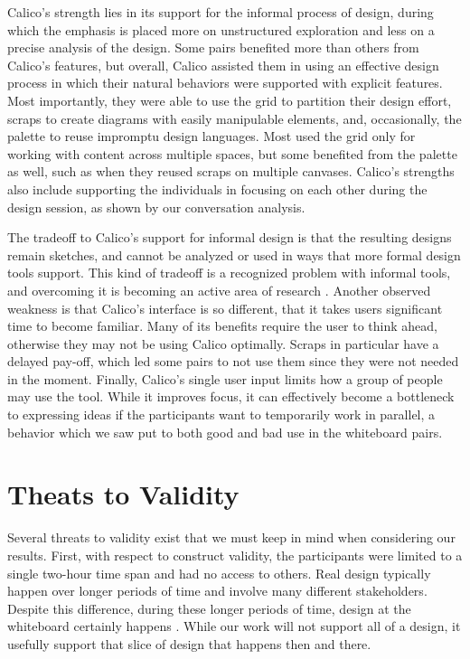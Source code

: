 Calico's strength lies in its support for the informal process of design, during which the emphasis is placed more on unstructured exploration and less on a precise analysis of the design. Some pairs benefited more than others from Calico's features, but overall, Calico assisted them in using an effective design process in which their natural behaviors were supported with explicit features. Most importantly, they were able to use the grid to partition their design effort, scraps to create diagrams with easily manipulable elements, and, occasionally, the palette to reuse impromptu design languages.  Most used the grid only for working with content across multiple spaces, but some benefited from the palette as well, such as when they reused scraps on multiple canvases. Calico's strengths also include supporting the individuals in focusing on each other during the design session, as shown by our conversation analysis. 

The tradeoff to Calico's support for informal design is that the resulting designs remain sketches, and cannot be analyzed or used in ways that more formal design tools support. This kind of tradeoff is a recognized problem with informal tools, and overcoming it is becoming an active area of research \citep{Ossher2}. Another observed weakness is that Calico's interface is so different, that it takes users significant time to become familiar. Many of its benefits require the user to think ahead, otherwise they may not be using Calico optimally. Scraps in particular have a delayed pay-off, which led some pairs to not use them since they were not needed in the moment. Finally, Calico's single user input limits how a group of people may use the tool. While it improves focus, it can effectively become a bottleneck to expressing ideas if the participants want to temporarily work in parallel, a behavior which we saw put to both good and bad use in the whiteboard pairs.

\section{Theats to Validity}
\label{threatstovalidity}

Several threats to validity exist that we must keep in mind when considering our results. First, with respect to construct  validity, the participants were limited to a single two-hour time span and had no access to others. Real design typically  happen over longer periods of time and involve many different stakeholders. Despite this difference, during these longer periods of time, design at the whiteboard certainly happens \citep{Cherubini}. While our work will not support all of a design, it usefully support that slice of design that happens then and there.

